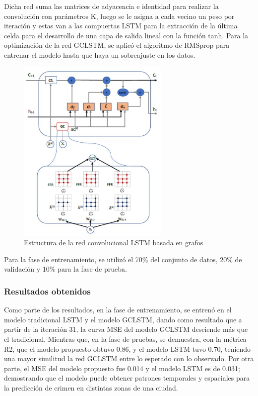 Dicha red suma las matrices de adyacencia e identidad para realizar la convolución con parámetros K, luego se le asigna a cada vecino un peso por iteración y estas van a las compuertas LSTM para la extracción de la última celda para el desarrollo de una capa de salida lineal con la función tanh. Para la optimización de la red GCLSTM, se aplicó el algoritmo de RMSprop para entrenar el modelo hasta que haya un sobreajuste en los datos.


\begin{figure}[h]
	\begin{center}
		\includegraphics[width=0.65\textwidth]{2/figures/EsquivelRed.jpg}
		\caption{Estructura de la red convolucional LSTM basada en grafos}
		\label{1:fig2}
	\end{center}
\end{figure}

Para la fase de entrenamiento, se utilizó el 70\% del conjunto de datos, 20\% de validación y 10\% para la fase de prueba.

\subsubsection{Resultados obtenidos}
Como parte de los resultados, en la fase de entrenamiento, se entrenó en el modelo tradicional LSTM y el modelo GCLSTM, dando como resultado que a partir de la iteración 31, la curva MSE del modelo GCLSTM desciende más que el tradicional. 
Mientras que, en la fase de pruebas, se demuestra, con la métrica R2, que el modelo propuesto obtuvo 0.86, y el modelo LSTM tuvo 0.70, teniendo una mayor similitud la red GCLSTM entre lo esperado con lo observado. Por otra parte, el MSE del modelo propuesto fue 0.014 y el modelo LSTM es de 0.031; demostrando que el modelo puede obtener patrones temporales y espaciales para la predicción de crimen en distintas zonas de una ciudad. 

